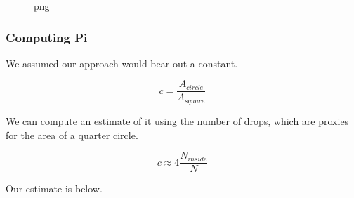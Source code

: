 \begin{figure}
\centering
{}
\caption{png}
\end{figure}

\subsubsection{Computing Pi}\label{computing-pi}

We assumed our approach would bear out a constant.

\[c=\dfrac{A_{circle}}{A_{square}}\]

We can compute an estimate of it using the number of drops, which are
proxies for the area of a quarter circle.

\[c \approx 4\dfrac{N_{inside}}{N}\]

Our estimate is below.

\begin{Shaded}
\begin{Highlighting}[]
\OperatorTok{=} \OperatorTok{*}\OperatorTok{/}
\end{Highlighting}
\end{Shaded}

